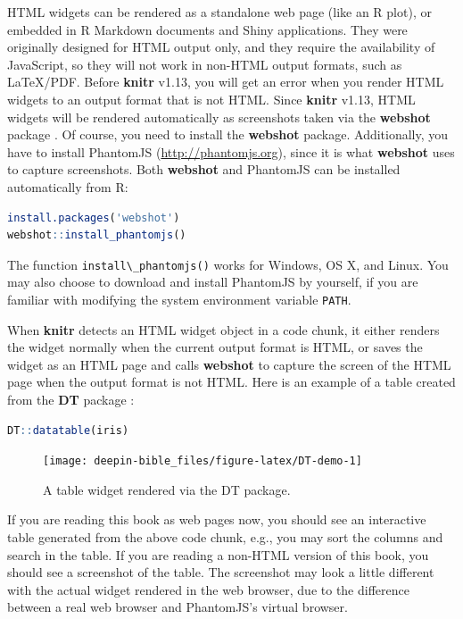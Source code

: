 \documentclass[doctor,openright,twoside]{sjtuthesis}
\newcommand{\passthrough}[1]{#1}
\theoremstyle{plain}
\theoremstyle{definition}
\theoremstyle{remark}
\theoremstyle{ocrenumbox}
\theoremstyle{plain}
\begin{document}
HTML widgets can be rendered as a standalone web page (like an R plot), or embedded in R Markdown documents and Shiny applications. They were originally designed for HTML output only, and they require the availability of JavaScript, so they will not work in non-HTML output formats, such as LaTeX/PDF. Before \textbf{knitr} v1.13, you will get an error when you render HTML widgets to an output format that is not HTML. Since \textbf{knitr} v1.13, HTML widgets will be rendered automatically as screenshots taken via the \textbf{webshot} package \autocite{R-webshot}. Of course, you need to install the \textbf{webshot} package. Additionally, you have to install PhantomJS (\url{http://phantomjs.org}), since it is what \textbf{webshot} uses to capture screenshots. Both \textbf{webshot} and PhantomJS can be installed automatically from R:

\begin{lstlisting}[language=R]
install.packages('webshot')
webshot::install_phantomjs()
\end{lstlisting}

The function \passthrough{\lstinline!install\_phantomjs()!} works for Windows, OS X, and Linux. You may also choose to download and install PhantomJS by yourself, if you are familiar with modifying the system environment variable \passthrough{\lstinline!PATH!}.

When \textbf{knitr} detects an HTML widget object in a code chunk, it either renders the widget normally when the current output format is HTML, or saves the widget as an HTML page and calls \textbf{webshot} to capture the screen of the HTML page when the output format is not HTML. Here is an example of a table created from the \textbf{DT} package \autocite{R-DT}:

\begin{lstlisting}[language=R]
DT::datatable(iris)
\end{lstlisting}

\begin{figure}
\texttt{[image: deepin-bible\_files/figure-latex/DT-demo-1]} \caption[A table widget rendered via the DT package]{A table widget rendered via the DT package.}\label{fig:DT-demo}
\end{figure}

If you are reading this book as web pages now, you should see an interactive table generated from the above code chunk, e.g., you may sort the columns and search in the table. If you are reading a non-HTML version of this book, you should see a screenshot of the table. The screenshot may look a little different with the actual widget rendered in the web browser, due to the difference between a real web browser and PhantomJS's virtual browser.
\end{document}
